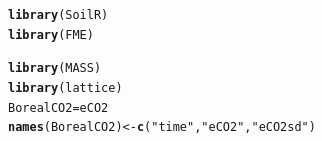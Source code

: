 \documentclass[a4paper]{article}\usepackage[]{graphicx}\usepackage[]{color}
\makeatletter
\newcommand{\hlstr}[1]{\textcolor[rgb]{0.192,0.494,0.8}{#1}}%
\newcommand{\hlstd}[1]{\textcolor[rgb]{0.345,0.345,0.345}{#1}}%
\newcommand{\hlkwb}[1]{\textcolor[rgb]{0.69,0.353,0.396}{#1}}%
\newcommand{\hlkwd}[1]{\textcolor[rgb]{0.737,0.353,0.396}{\textbf{#1}}}%
\newenvironment{kframe}{%
 \def\at@end@of@kframe{}%
 \ifinner\ifhmode%
  \def\at@end@of@kframe{\end{minipage}}%
  \begin{minipage}{\columnwidth}%
 \fi\fi%
 \def\FrameCommand##1{\hskip\@totalleftmargin \hskip-\fboxsep
 \colorbox{shadecolor}{##1}\hskip-\fboxsep
     \hskip-\linewidth \hskip-\@totalleftmargin \hskip\columnwidth}%
 \MakeFramed {\advance\hsize-\width
   \@totalleftmargin\z@ \linewidth\hsize
   \@setminipage}}%
 {\par\unskip\endMakeFramed%
 \at@end@of@kframe}
\newenvironment{knitrout}{}{} %
\makeatother
\begin{document}
\begin{knitrout}
\color{fgcolor}\begin{kframe}
\begin{alltt}
\hlkwd{library}\hlstd{(SoilR)}
\hlkwd{library}\hlstd{(FME)}
\end{alltt}


{\ttfamily\noindent\itshape\color{messagecolor}{\#\# Loading required package: rootSolve}}

{\ttfamily\noindent\itshape\color{messagecolor}{\#\# Loading required package: coda}}\begin{alltt}
\hlkwd{library}\hlstd{(MASS)}
\hlkwd{library}\hlstd{(lattice)}
\hlstd{BorealCO2}\hlkwb{=}\hlstd{eCO2}
\hlkwd{names}\hlstd{(BorealCO2)}\hlkwb{<-}\hlkwd{c}\hlstd{(}\hlstr{"time"}\hlstd{,}\hlstr{"eCO2"}\hlstd{,}\hlstr{"eCO2sd"}\hlstd{)}
\end{alltt}
\end{kframe}
\end{knitrout}

\end{document}
